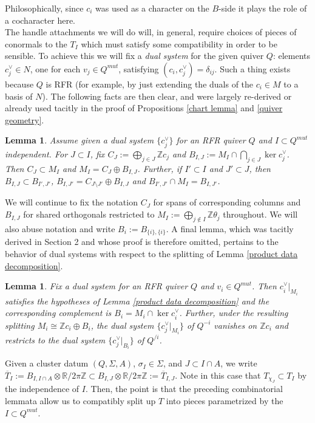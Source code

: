 \documentclass[11pt]{amsart}
\newtheorem{lem}[thm]{Lemma}
\theoremstyle{definition}
\theoremstyle{remark}
\newcommand{\Z}{\mathbb{Z}}
\numberwithin{equation}{section}
\begin{document}
Philosophically, since $c_i$ was used as a character on the $B$-side it plays the role of a cocharacter here.\\

The handle attachments we will do will, in general, require choices of pieces of conormals to the $T_I$ which must satisfy some compatibility in order to be sensible. To achieve this we will fix a \textit{dual system} for the given quiver $Q$: elements $c_j^\vee\in N$, one for each $v_j \in Q^{mut}$, satisfying $(c_i,c_j^\vee)=\delta_{ij}$. Such a thing exists because $Q$ is RFR (for example, by just extending the duals of the $c_i \in M$ to a basis of $N$). The following facts are then clear, and were largely re-derived or already used tacitly in the proof of Propositions \ref{chart lemma} and \ref{quiver geometry}.

\begin{lem}\label{dual system lemma}
    Assume given a dual system $\{c_j^\vee\}$ for an RFR quiver $Q$ and $I \subset Q^{mut}$ independent. For $J \subset I$, fix $C_J:=\bigoplus_{j\in J}\Z c_j$ and $B_{I,J}:=M_I\cap\bigcap_{j\in J}\ker c_j^\vee$. Then $C_J\subset M_I$ and $M_I=C_J\oplus B_{I,J}$. Further, if $I'\subset I$ and $J'\subset J$, then $B_{I,J}\subset B_{I',J'}$, $B_{I,J'}=C_{J\setminus J'}\oplus B_{I,J}$ and $B_{I',J'}\cap M_I=B_{I,J'}$.
\end{lem}

We will continue to fix the notation $C_J$ for spans of corresponding columns and $B_{I, J}$ for shared orthogonals restricted to $M_I := \bigoplus_{j \notin I} \mathbb{Z} \theta_j$ throughout. We will also abuse notation and write $B_{i} := B_{\{i\}, \{i\}}$. A final lemma, which was tacitly derived in Section 2 and whose proof is therefore omitted, pertains to the behavior of dual systems with respect to the splitting of Lemma \ref{product data decomposition}.

\begin{lem}
  Fix a dual system for an RFR quiver $Q$ and $v_i\in Q^{mut}$. Then $c_i^\vee|_{M_i}$ satisfies the hypotheses of Lemma \ref{product data decomposition} and the corresponding complement is $B_i=M_i\cap\ker c_i^\vee$. Further, under the resulting splitting $M_i\cong\mathbb Zc_i\oplus B_i$, the dual system $\{c_j^\vee|_{M_i}\}$ of $Q^{-i}$ vanishes on $\mathbb Zc_i$ and restricts to the dual system $\{c_j^\vee|_{B_i}\}$ of $Q^{/i}$.
\end{lem}

Given a cluster datum $(Q, \Sigma, A)$, $\sigma_I \in \Sigma$, and $J \subset I \cap A$, we write $\overline{T}_I := B_{I, I \cap A} \otimes \mathbb{R}/2\pi\mathbb{Z} \subset B_{I, J} \otimes \mathbb{R}/2\pi\mathbb{Z} := \overline{T}_{I, J}$. Note in this case that $T_{\chi_J} \subset T_I$ by the independence of $I$. Then, the point is that the preceding combinatorial lemmata allow us to compatibly split up $T$ into pieces parametrized by the $I \subset Q^{mut}$.  
\end{document}
